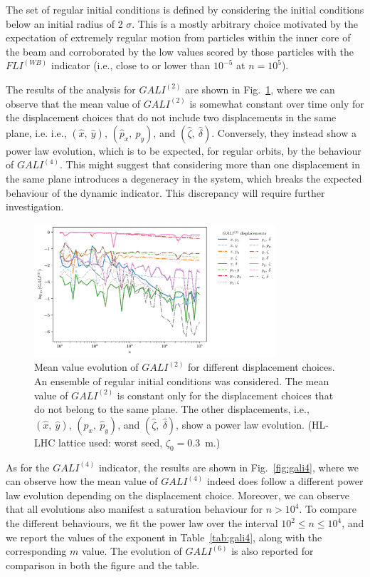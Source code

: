 The set of regular initial conditions is defined by considering the initial conditions below an initial radius of 2 $\sigma$. This is a mostly arbitrary choice motivated by the expectation of extremely regular motion from particles within the inner core of the beam and corroborated by the low values scored by those particles with the $FLI^{(WB)}$ indicator (i.e., close to or lower than $10^{-5}$ at $n=10^5$).

The results of the analysis for $GALI^{(2)}$ are shown in Fig.~\ref{fig:gali2}, where we can observe that the mean value of $GALI^{(2)}$ is somewhat constant over time only for the displacement choices that do not include two displacements in the same plane, i.e. i.e., $(\hat{x},\ \hat{y})$, $(\hat{p}_x,\ \hat{p}_y)$, and $(\hat{\zeta},\ \hat{\delta})$. Conversely, they instead show a power law evolution, which is to be expected, for regular orbits, by the behaviour of $GALI^{(4)}$.
This might suggest that considering more than one displacement in the same plane introduces a degeneracy in the system, which breaks the expected behaviour of the dynamic indicator. This discrepancy will require further investigation.

\begin{figure}
    \centering
    \includegraphics[width=0.8\textwidth]{6_lhc_dynamic_indicators/figs/evolution_gali_2_stable.pdf}
    \caption{Mean value evolution of $GALI^{(2)}$ for different displacement choices. An ensemble of regular initial conditions was considered. The mean value of $GALI^{(2)}$ is constant only for the displacement choices that do not belong to the same plane. The other displacements, i.e., $(\hat{x},\ \hat{y})$, $(\hat{p}_x,\ \hat{p}_y)$, and $(\hat{\zeta},\ \hat{\delta})$, show a power law evolution. (HL-LHC lattice used: worst seed, $\zeta_0=$\SI{0.3}{\meter}.)}
    \label{fig:gali2}
\end{figure}

As for the $GALI^{(4)}$ indicator, the results are shown in Fig.~\ref{fig:gali4}, where we can observe how the mean value of $GALI^{(4)}$ indeed does follow a different power law evolution depending on the displacement choice. Moreover, we can observe that all evolutions also manifest a saturation behaviour for $n>10^4$. To compare the different behaviours, we fit the power law over the interval $10^2\leq n \leq 10^4$, and we report the values of the exponent in Table~\ref{tab:gali4}, along with the corresponding $m$ value. The evolution of $GALI^{(6)}$ is also reported for comparison in both the figure and the table.

